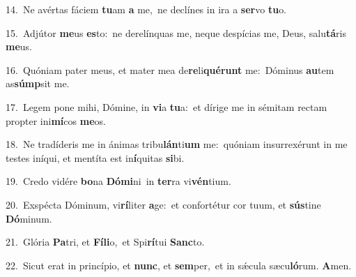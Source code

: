 {\numbfont\textcolor{\numbcolor}{14.}}~Ne avértas fáciem \textbf{tu}\-am \textbf{a} me,~\star ne declínes in ira a \textbf{ser}\-vo \textbf{tu}\-o.\par
{\numbfont\textcolor{\numbcolor}{15.}}~Adjútor \textbf{me}\-us \textbf{es}\-to:~\star ne derelínquas me, neque despícias me, Deus, salu\-\textbf{tá}\-ris \textbf{me}\-us.\par
{\numbfont\textcolor{\numbcolor}{16.}}~Quóniam pater meus, et mater mea de\-\textbf{re}\-li\-\textbf{qué}\-\textbf{runt} me:~\star Dóminus \textbf{au}\-tem as\-\textbf{súmp}\-sit me.\par
{\numbfont\textcolor{\numbcolor}{17.}}~Legem pone mihi, Dómine, in \textbf{vi}\-a \textbf{tu}\-a:~\star et dírige me in sémitam rectam propter ini\-\textbf{mí}\-cos \textbf{me}\-os.\par
{\numbfont\textcolor{\numbcolor}{18.}}~Ne tradíderis me in ánimas tribu\-\textbf{lán}\-ti\textbf{um} me:~\star quóniam insurrexérunt in me testes iníqui, et mentíta est in\-\textbf{í}\-quitas \textbf{si}\-bi.\par
{\numbfont\textcolor{\numbcolor}{19.}}~Credo vidére \textbf{bo}\-na \textbf{Dó}\-\textbf{mi}ni~\star in \textbf{ter}\-ra vi\-\textbf{vén}\-tium.\par
{\numbfont\textcolor{\numbcolor}{20.}}~Exspécta Dóminum, vi\-\textbf{rí}\-liter \textbf{a}\-ge:~\star et confortétur cor tuum, et \textbf{sús}\-tine \textbf{Dó}\-minum.\par
{\numbfont\textcolor{\numbcolor}{21.}}~Glória \textbf{Pa}\-tri, et \textbf{Fí}\-\textbf{li}o,~\star et Spi\-\textbf{rí}\-tui \textbf{Sanc}\-to.\par
{\numbfont\textcolor{\numbcolor}{22.}}~Sicut erat in princípio, et \textbf{nunc}\-, et \textbf{sem}\-per,~\star et in sǽcula sæcu\-\textbf{ló}\-rum. \textbf{A}\-men.\par
